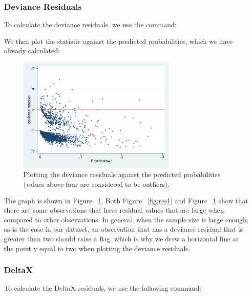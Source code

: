 \documentclass[a4paper,12pt,oneside]{book}
\begin{document}
\subsubsection{Deviance Residuals} 
To calculate the deviance residuals, we use the command:

\begin{stlog}\end{stlog}

We then plot the statistic against the predicted probabilities, which we have already calculated:

\begin{stlog}\end{stlog}
\begin{figure}[h]
    \centering
    \includegraphics[width=0.7\textwidth]{book_46.pdf}
    \caption{Plotting the deviance residuals against the predicted probabilities (values above four are considered to be outliers).}
    \label{fig:res2}
\end{figure}

The graph is shown in Figure ~\ref{fig:res2}. Both Figure ~\ref{fig:res1} and Figure ~\ref{fig:res2} show that there are some observations that have residual values that are large when compared to other observations. 
In general, when the sample size is large enough, as is the case in our dataset, an observation that has a deviance residual that is greater than two should raise a flag, which is why we drew a horizontal 
line at the point y equal to two when plotting the deviance residuals.

\subsubsection{DeltaX}
To calculate the DeltaX residuals, we use the following command:

\begin{stlog}\end{stlog}
\end{document}
